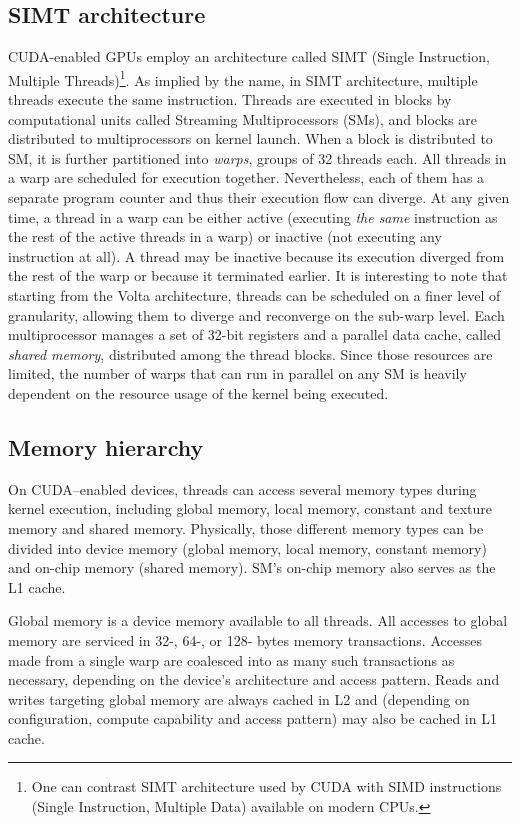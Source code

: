 \subsection{SIMT architecture}
CUDA-enabled GPUs employ an architecture called SIMT (Single Instruction, Multiple
Threads)\footnote{One can contrast SIMT architecture used by CUDA with SIMD instructions (Single
Instruction, Multiple  Data) available on modern CPUs.}. As implied by the name, in SIMT
architecture, multiple threads execute the same instruction. Threads are executed in blocks by
computational units called Streaming Multiprocessors (SMs), and blocks are distributed to
multiprocessors on kernel launch. When a block is distributed to SM, it is further partitioned into
\emph{warps}, groups of 32 threads each. All threads in a warp are scheduled for execution together.
Nevertheless, each of them has a separate program counter and thus their execution flow can diverge.
At any given time, a thread in a warp can be either active (executing \emph{the same} instruction
as the rest of the active threads in a warp) or inactive (not executing any instruction at all). A
thread may be inactive because its execution diverged from the rest of the warp or because it
terminated earlier. It is interesting to note that starting from the Volta architecture, threads can
be scheduled on a finer level of granularity, allowing them to diverge and reconverge on the
sub-warp level. Each multiprocessor manages a set of 32-bit registers and a parallel data cache,
called \emph{shared memory}, distributed among the thread blocks. Since those resources are limited,
the number of warps that can run in parallel on any SM is heavily dependent on the resource usage of
the kernel being executed.

\subsection{Memory hierarchy}

On CUDA--enabled devices, threads can access several memory types during kernel execution, including
global memory, local memory, constant and texture memory and shared memory. Physically, those
different memory types can be divided into device memory (global memory, local memory, constant
memory) and on-chip memory (shared memory). SM's on-chip memory also serves as the L1 cache.

Global memory is a device memory available to all threads. All accesses to global memory are
serviced in 32-, 64-, or 128- bytes memory transactions. Accesses made from a single warp are
coalesced into as many such transactions as necessary, depending on the device's
architecture and access pattern. Reads and writes targeting global memory are always cached in L2
and (depending on configuration, compute capability and access pattern) may also be cached in L1
cache.

